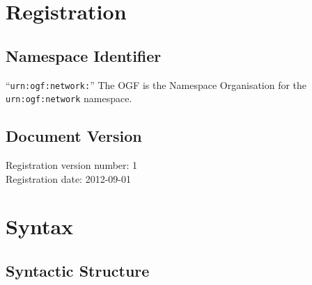 \documentclass[12pt]{article}  %
\begin{document}
\newcommand{\qq}{\symbol{34}} %
\newcommand{\q}{\textquotesingle} %
\newcommand{\underscore}{\symbol{95}} %


\section{Registration}

\subsection{Namespace Identifier}

“\texttt{urn:ogf:network:}”
The OGF is the Namespace Organisation for the \texttt{urn:ogf:network} namespace.

\subsection{Document Version}

Registration version number: 1 \\
Registration date: 2012-09-01  %

\section{Syntax}

\subsection{Syntactic Structure}
\end{document}
